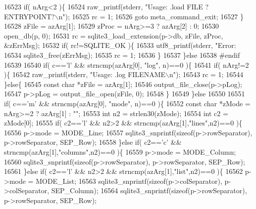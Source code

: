 \begin{DoxyCode}
{{{{{{{{{{{{{{{{{{{{{{{{{{{{{{{{{{{{{{{{{{{{{{{{{{{{{{16523     \textcolor{keywordflow}{if}( nArg<2 )\{
16524       raw_printf(stderr, \textcolor{stringliteral}{"Usage: .load FILE ?ENTRYPOINT?\(\backslash\)n"});
16525       rc = 1;
16526       \textcolor{keywordflow}{goto} meta\_command\_exit;
16527     \}
16528     zFile = azArg[1];
16529     zProc = nArg>=3 ? azArg[2] : 0;
16530     open_db(p, 0);
16531     rc = sqlite3_load_extension(p->db, zFile, zProc, &zErrMsg);
16532     \textcolor{keywordflow}{if}( rc!=SQLITE_OK )\{
16533       utf8_printf(stderr, \textcolor{stringliteral}{"Error: %
16534       sqlite3_free(zErrMsg);
16535       rc = 1;
16536     \}
16537   \}\textcolor{keywordflow}{else}
16538 \textcolor{preprocessor}{#endif}
16539 
16540   \textcolor{keywordflow}{if}( c==\textcolor{charliteral}{'l'} && strncmp(azArg[0], \textcolor{stringliteral}{"log"}, n)==0 )\{
16541     \textcolor{keywordflow}{if}( nArg!=2 )\{
16542       raw_printf(stderr, \textcolor{stringliteral}{"Usage: .log FILENAME\(\backslash\)n"});
16543       rc = 1;
16544     \}\textcolor{keywordflow}{else}\{
16545       \textcolor{keyword}{const} \textcolor{keywordtype}{char} *zFile = azArg[1];
16546       output_file_close(p->pLog);
16547       p->pLog = output_file_open(zFile, 0);
16548     \}
16549   \}\textcolor{keywordflow}{else}
16550 
16551   \textcolor{keywordflow}{if}( c==\textcolor{charliteral}{'m'} && strncmp(azArg[0], \textcolor{stringliteral}{"mode"}, n)==0 )\{
16552     \textcolor{keyword}{const} \textcolor{keywordtype}{char} *zMode = nArg>=2 ? azArg[1] : \textcolor{stringliteral}{""};
16553     \textcolor{keywordtype}{int} n2 = strlen30(zMode);
16554     \textcolor{keywordtype}{int} c2 = zMode[0];
16555     \textcolor{keywordflow}{if}( c2==\textcolor{charliteral}{'l'} && n2>2 && strncmp(azArg[1],\textcolor{stringliteral}{"lines"},n2)==0 )\{
16556       p->mode = MODE_Line;
16557       sqlite3_snprintf(\textcolor{keyword}{sizeof}(p->rowSeparator), p->rowSeparator, SEP_Row);
16558     \}\textcolor{keywordflow}{else} \textcolor{keywordflow}{if}( c2==\textcolor{charliteral}{'c'} && strncmp(azArg[1],\textcolor{stringliteral}{"columns"},n2)==0 )\{
16559       p->mode = MODE_Column;
16560       sqlite3_snprintf(\textcolor{keyword}{sizeof}(p->rowSeparator), p->rowSeparator, SEP_Row);
16561     \}\textcolor{keywordflow}{else} \textcolor{keywordflow}{if}( c2==\textcolor{charliteral}{'l'} && n2>2 && strncmp(azArg[1],\textcolor{stringliteral}{"list"},n2)==0 )\{
16562       p->mode = MODE_List;
16563       sqlite3_snprintf(\textcolor{keyword}{sizeof}(p->colSeparator), p->colSeparator, SEP_Column);
16564       sqlite3_snprintf(\textcolor{keyword}{sizeof}(p->rowSeparator), p->rowSeparator, SEP_Row);
}}}}}}}}}}}}}}}}}}}}}}}}}}}}}}}}}}}}}}}}}}}}}}}}}}}}}}}
\end{DoxyCode}
